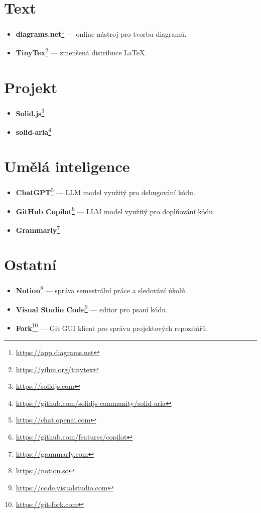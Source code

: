 \section{Text}

\begin{itemize}
    \item \textbf{diagrams.net}\footnote{\url{https://app.diagrams.net}} --- online nástroj pro tvorbu diagramů.
    \item \textbf{TinyTex}\footnote{\url{https://yihui.org/tinytex}} --- zmenšená distribuce \LaTeX.
\end{itemize}

\section{Projekt}

\begin{itemize}
    \item \textbf{Solid.js}\footnote{\url{https://solidjs.com}}
    \item \textbf{solid-aria}\footnote{\url{https://github.com/solidjs-community/solid-aria}}
\end{itemize}

\section{Umělá inteligence}

\begin{itemize}
    \item \textbf{ChatGPT}\footnote{\url{https://chat.openai.com}} --- LLM model využitý pro debugování kódu.
    \item \textbf{GitHub Copilot}\footnote{\url{https://github.com/features/copilot}} --- LLM model využitý pro doplňování kódu.
    \item \textbf{Grammarly}\footnote{\url{https://grammarly.com}}
\end{itemize}

\section{Ostatní}

\begin{itemize}
    \item \textbf{Notion}\footnote{\url{https://notion.so}} --- správa semestrální práce a sledování úkolů.
    \item \textbf{Visual Studio Code}\footnote{\url{https://code.visualstudio.com}} --- editor pro psaní kódu.
    \item \textbf{Fork}\footnote{\url{https://git-fork.com}} --- Git GUI klient pro správu projektových repozitářů.
\end{itemize}
